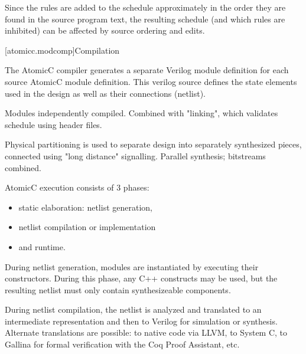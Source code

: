 Since the rules are added to the schedule approximately in the order they are
found in the source program text, the resulting schedule (and which rules are
inhibited) can be affected by source ordering and edits.

[atomicc.modcomp]{Compilation}

The AtomicC compiler generates a separate Verilog module definition
for each source AtomicC module definition.
This verilog source defines the state elements
used in the design as well as their connections (netlist).

Modules independently compiled.  Combined with "linking", which validates schedule using header files.

Physical partitioning is used to separate design into separately synthesized pieces, connected using
"long distance" signalling.  Parallel synthesis; bitstreams combined.

AtomicC execution consists of 3 phases:
\begin{itemize}
\item static elaboration: netlist generation, 
\item netlist compilation or implementation
\item and runtime.
\end{itemize}

During netlist
generation, modules are instantiated by executing their
constructors. During this phase, any C++ constructs may be used, but
the resulting netlist must only contain synthesizeable components.

During netlist compilation, the netlist is analyzed and translated to
an intermediate representation and then to Verilog for simulation or
synthesis. Alternate translations are possible: to native code via
LLVM, to System C, to Gallina for formal verification with the Coq
Proof Assistant, etc.
